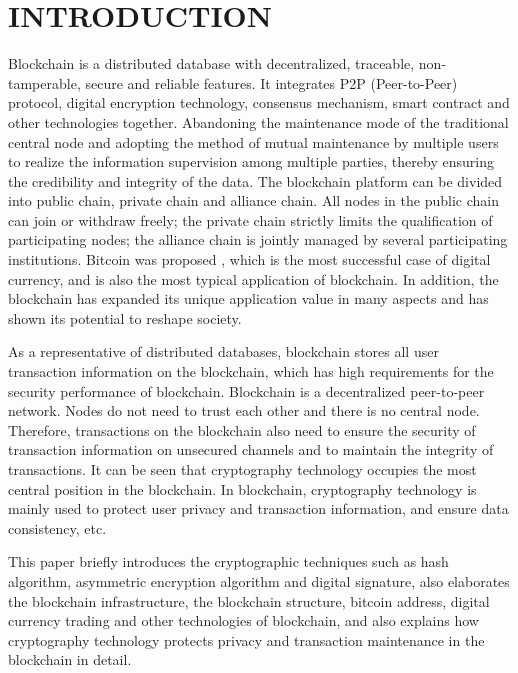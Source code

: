 \documentclass[BTech]{srmuthesis}
\begin{document}
 \section{INTRODUCTION}
 Blockchain is a distributed database with decentralized, traceable, non-tamperable, secure and reliable features. It integrates P2P (Peer-to-Peer) protocol, digital encryption technology, consensus mechanism, smart contract and other technologies together. Abandoning the maintenance mode of the traditional central node and adopting the method of mutual maintenance by multiple users to realize the information supervision among multiple parties, thereby ensuring the credibility and integrity of the data. The blockchain platform can be divided into public chain, private chain and alliance chain. All nodes in the public chain can join or withdraw freely; the private chain strictly limits the qualification of participating nodes; the alliance chain is jointly managed by several participating institutions. Bitcoin was proposed \citet{bc}, which is the most successful case of digital currency, and is also the most typical application of blockchain. In addition, the blockchain has expanded its unique application value in many aspects and has shown its potential to reshape society.
 
 As a representative of distributed databases, blockchain stores all user transaction information on the blockchain, which has high requirements for the security performance of blockchain. Blockchain is a decentralized peer-to-peer network. Nodes do not need to trust each other and there is no central node. Therefore, transactions on the blockchain also need to ensure the security of transaction information on unsecured channels and to maintain the integrity of transactions. It can be seen that cryptography technology occupies the most central position in the blockchain. In blockchain, cryptography technology is mainly used to protect user privacy and transaction information, and ensure data consistency, etc.

 This paper briefly introduces the cryptographic techniques such as hash algorithm, asymmetric encryption algorithm and digital signature, also elaborates the blockchain infrastructure, the blockchain structure, bitcoin address, digital currency trading and other technologies of blockchain, and also explains how cryptography technology protects privacy and transaction maintenance in the blockchain in detail.
\end{document}
